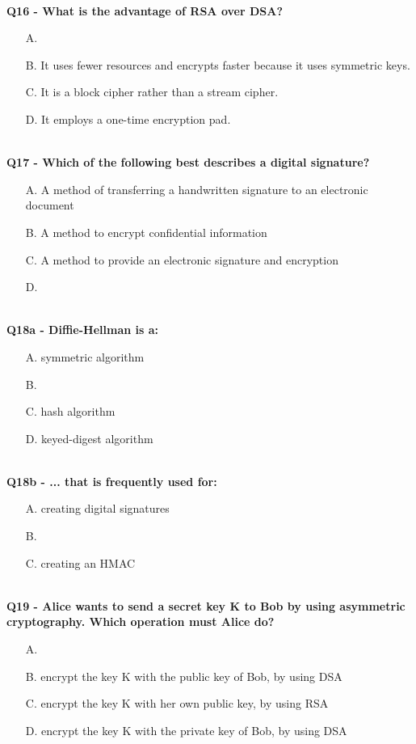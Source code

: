 \textbf{\\Q16 - What is the advantage of RSA over DSA?}
\begin{enumerate}
	\item[A.] 
	\item[B.] It uses fewer resources and encrypts faster because it uses symmetric keys.
	\item[C.] It is a block cipher rather than a stream cipher.
	\item[D.] It employs a one-time encryption pad.
\end{enumerate}

\textbf{\\Q17 - Which of the following best describes a digital signature?}
\begin{enumerate}
	\item[A.] A method of transferring a handwritten signature to an electronic document
	\item[B.] A method to encrypt confidential information
	\item[C.] A method to provide an electronic signature and encryption
	\item[D.] 
\end{enumerate}

\textbf{\\Q18a - Diffie-Hellman is a:}
\begin{enumerate}
	\item[A.] symmetric algorithm
	\item[B.] 
	\item[C.] hash algorithm
	\item[D.] keyed-digest algorithm
\end{enumerate}

\textbf{\\Q18b - ... that is frequently used for:}
\begin{enumerate}
	\item[A.] creating digital signatures
	\item[B.] 
	\item[C.] creating an HMAC
\end{enumerate}

\textbf{\\Q19 - Alice wants to send a secret key K to Bob by using asymmetric cryptography. Which operation must Alice do?}
\begin{enumerate}
	\item[A.] 
	\item[B.] encrypt the key K with the public key of Bob, by using DSA
	\item[C.] encrypt the key K with her own public key, by using RSA
	\item[D.] encrypt the key K with the private key of Bob, by using DSA
\end{enumerate}

